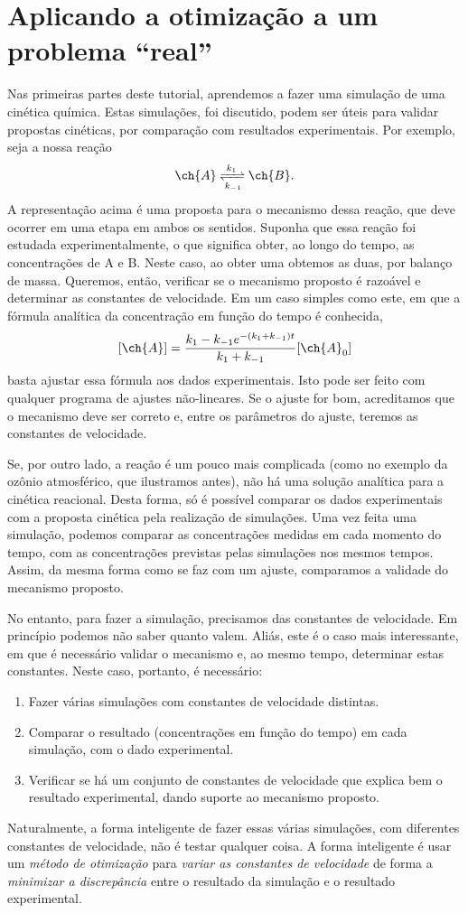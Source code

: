 \documentclass[10pt,a4paper,ssfamily]{exam}
\begin{document}
\section{Aplicando a otimização a um problema ``real''}
\label{real2d}

Nas primeiras partes deste tutorial, aprendemos a fazer uma simulação de
uma cinética química. Estas simulações, foi discutido, podem ser úteis
para validar propostas cinéticas, por comparação com resultados
experimentais. Por exemplo, seja a nossa reação 
\[
\ch{A} \xrightleftharpoons[k_{-1}]{k_1} \ch{B}.
\]
A representação acima é uma proposta para o mecanismo dessa reação, que
deve ocorrer em uma etapa em ambos os sentidos. Suponha que essa reação
foi estudada experimentalmente, o que significa obter, ao longo do
tempo, as concentrações de A e B. Neste caso, ao obter uma obtemos as
duas, por balanço de massa. Queremos, então, verificar se o mecanismo
proposto é razoável e determinar as constantes de velocidade. Em um caso
simples como este, em que a fórmula analítica da concentração em
função do tempo é conhecida, 
\[
[\ch{A}] = \frac{k_1-k_{-1}e^{-(k_1+k_{-1})t}}{k_1+k_{-1}}[\ch{A}_0]
\]
basta ajustar essa fórmula aos
dados experimentais. Isto pode ser feito com qualquer programa de
ajustes não-lineares. Se o ajuste for bom, acreditamos que o mecanismo
deve ser correto e, entre os parâmetros do ajuste, teremos as constantes
de velocidade. 

Se, por outro lado, a reação é um pouco mais complicada (como no exemplo
da ozônio atmosférico, que ilustramos antes), não há uma solução
analítica para a cinética reacional. Desta forma, só é possível comparar
os dados experimentais com a proposta cinética pela realização de
simulações. Uma vez feita uma simulação, podemos comparar as
concentrações medidas em cada momento do tempo, com as concentrações
previstas pelas simulações nos mesmos tempos. Assim, da mesma forma como
se faz com um ajuste, comparamos a validade do mecanismo proposto. 

No entanto, para fazer a simulação, precisamos das constantes de
velocidade. Em princípio podemos não saber quanto valem. Aliás, este é o
caso mais interessante, em que é necessário validar o mecanismo e, ao
mesmo tempo, determinar estas constantes. Neste caso, portanto, é
necessário:
\begin{enumerate}
\item
Fazer várias simulações com constantes de velocidade distintas.
\item
Comparar o resultado (concentrações em função do tempo) em cada
simulação, com o dado experimental.
\item
Verificar se há um conjunto de constantes de velocidade que explica bem
o resultado experimental, dando suporte ao mecanismo proposto.
\end{enumerate}
Naturalmente, a forma inteligente de fazer essas várias simulações, com
diferentes constantes de velocidade, não é testar qualquer coisa. A
forma inteligente é usar um {\it método de otimização} para {\it variar
as constantes de velocidade} de forma a  {\it
minimizar a discrepância} entre o resultado da simulação e o resultado
experimental.
\end{document}
